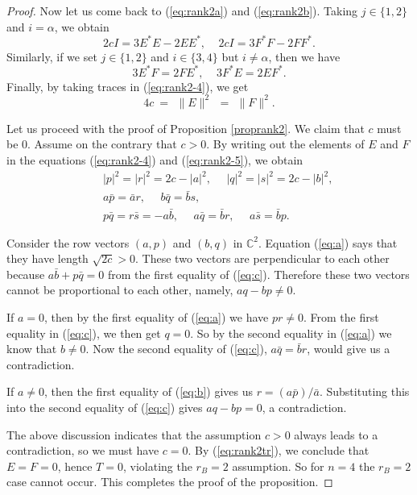 \documentclass[10pt,a4paper]{amsart}
\begin{document}
\begin{proof}
Now let us come back to (\ref{eq:rank2a}) and (\ref{eq:rank2b}). Taking $j\in\{1,2\}$ and $i=\alpha$, we obtain
\begin{equation}  \label{eq:rank2-4}
 2cI = 3 E^{\ast}E - 2 E E^{\ast}, \ \ \ \ \ 2cI = 3 F^{\ast}F - 2 F F^{\ast} .
\end{equation}
Similarly, if we set $j\in \{ 1,2\}$ and $i\in \{ 3,4\}$ but $i\neq \alpha$, then we have
\begin{equation}  \label{eq:rank2-5}
  3 E^{\ast}F = 2 F E^{\ast}, \ \ \ \ \ 3 F^{\ast}E = 2 E F^{\ast} .
\end{equation}
Finally, by taking traces in (\ref{eq:rank2-4}), we get
\begin{equation}  \label{eq:rank2tr}
 4c \ = \, \ \parallel\! E\! \parallel^2 \ \, = \, \ \parallel\! F\! \parallel^2 .
\end{equation}

Let us proceed with the proof of Proposition \ref{proprank2}. We claim that $c$ must be $0$. Assume on the contrary that $c>0$. By writing out the elements of $E$ and $F$ in the equations (\ref{eq:rank2-4}) and (\ref{eq:rank2-5}), we obtain
\begin{eqnarray}
 && |p|^2=|r|^2 = 2c - |a|^2, \ \ \ \ \ \ |q|^2=|s|^2 = 2c-|b|^2, \label{eq:a}\\
 && a \bar{p} = \bar{a}r, \ \ \ \ \ \ b\bar{q} = \bar{b}s, \label{eq:b} \\
 && p\bar{q} = r\bar{s} = -a\bar{b}, \ \ \ \ \ \ a\bar{q}=\bar{b}r, \ \ \ \ \ \ a\bar{s}=\bar{b}p.   \label{eq:c}
\end{eqnarray}

Consider the row vectors $(a,p)$ and $(b,q)$ in ${\mathbb C}^2$. Equation (\ref{eq:a}) says that they have length $\sqrt{2c}>0$. These two vectors are perpendicular to each other because $a\bar{b}+p\bar{q}=0$ from the first equality of (\ref{eq:c}). Therefore these two vectors cannot be proportional to each other, namely, $aq-bp\neq 0$.

If $a=0$, then by the first equality of (\ref{eq:a}) we have $pr\neq 0$. From the first equality in (\ref{eq:c}), we then get $q=0$.  So by the second equality in (\ref{eq:a}) we know that $b\neq 0$. Now the  second equality of (\ref{eq:c}), $a\bar{q}=\bar{b}r$, would give us a contradiction.

If $a\neq 0$, then the first equality of (\ref{eq:b}) gives us $r=(a\bar{p})/\bar{a}$. Substituting this into the second equality of (\ref{eq:c}) gives $aq-bp=0$, a contradiction.

The above discussion indicates that the assumption $c>0$ always leads to a contradiction, so we must have $c=0$. By (\ref{eq:rank2tr}), we conclude that  $E=F=0$, hence $T=0$, violating the $r_B=2$ assumption. So for $n=4$ the $r_B=2$ case cannot occur. This completes the proof of the proposition.
\end{proof}
\end{document}
